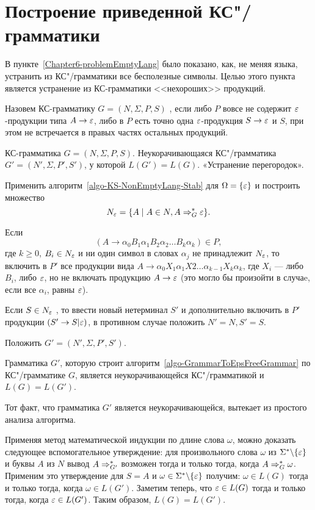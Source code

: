 \section{Построение приведенной КС"/грамматики}
\label{Chapter6-normalizeGrammar}

В пункте~\ref{Chapter6-problemEmptyLang} было показано, как, не меняя языка, устранить из КС"/грамматики все бесполезные символы. Целью этого пункта является устранение из КС-грамматики <<нехороших>> продукций.

Назовем КС-грамматику $G=(N,\Sigma,P,S)$ , если либо $P$ вовсе не содержит $\varepsilon$-продукции типа $A\to\varepsilon$, либо в $P$ есть точно одна $\varepsilon$-продукция $S\to\varepsilon$ и $S$, при этом не встречается в правых частях остальных продукций.

{\label{algo-GrammarToEpsFreeGrammar}КС-грамматика $G=(N,\Sigma,P,S)$.}
{Неукорачивающаяся КС"/грамматика $G'=(N',\Sigma,P',S')$, у которой $L(G')=L(G)$.}
{«Устранение перегородок».}
{
\item Применить алгоритм~\ref{algo-KS-NonEmptyLang-Stab} для $\Omega=\{\varepsilon\}$ и построить множество
\[
    N_\varepsilon=\{A\mid A\in N, A\Rightarrow_G^*\varepsilon\}.
\]

\item Если
\[
    (A\to\alpha_0B_1\alpha_1B_2\alpha_2 \ldots B_k\alpha_k)\in P,
\]
где $k\ge 0$, $B_i\in N_\varepsilon$ и ни один символ в словах $\alpha_j$ не принадлежит $N_\varepsilon$, то включить в $P'$ все продукции вида $A\to\alpha_0X_1\alpha_1X2 \ldots \alpha_{k-1}X_k\alpha_k$, где $X_i$ --- либо $B_i$, либо $\varepsilon$, но не включать продукцию $A\to\varepsilon$ (это могло бы произойти в случаe, если все $\alpha_i$, равны $\varepsilon$).

\item Если $S\in N_\varepsilon$ , то ввести новый нетерминал $S'$ и дополнительно включить в $P'$ продукции $(S'\to S|\varepsilon)$, в противном случае положить $N'=N, S'=S$.

\item Положить $G'=(N',\Sigma,P',S')$.
}

\begin{mytheorem}
\label{theorem-AlgoDelEpsProductionsCorrectness}
Грамматика $G'$, которую строит алгоритм~\ref{algo-GrammarToEpsFreeGrammar} по КС"/грамматике $G$, является неукорачивающейся КС"/грамматикой и $L(G)=L(G')$.
\end{mytheorem}

\begin{myproof}
Тот факт, что грамматика $G'$ является неукорачивающейся, вытекает из простого анализа алгоритма.

Применяя метод математической индукции по длине слова $\omega$, можно доказать следующее вспомогательное утверждение: для произвольного слова $\omega$ из $\Sigma^*\backslash\{\varepsilon\}$ и буквы $A$ из $N$ вывод $A\Rightarrow_{G'}^*$ возможен тогда и только тогда, когда $A\Rightarrow_G^*\omega$. Применим это утверждение для $S=A$ и $\omega\in\Sigma^*\backslash\{\varepsilon\}$ получим: $\omega\in L(G)$ тогда и только тогда, когда $\omega\in L(G')$. Заметим теперь, что $\varepsilon\in L(G)$ тогда и только тогда, когда $\varepsilon\in L(G')$. Таким образом, $L(G)=L(G')$.
\end{myproof}

